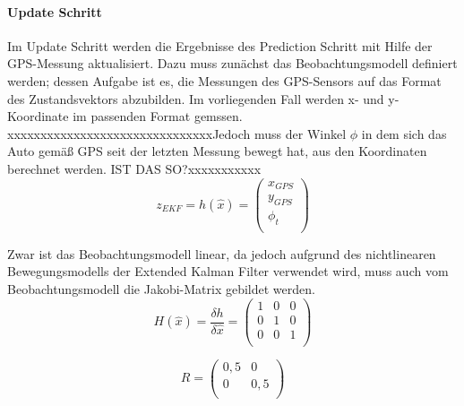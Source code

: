 \documentclass[11pt]{article}
\begin{document}
\paragraph{Update Schritt}
Im Update Schritt werden die Ergebnisse des Prediction Schritt mit Hilfe der GPS-Messung aktualisiert. Dazu muss zunächst das Beobachtungsmodell definiert werden; dessen Aufgabe ist es, die Messungen des GPS-Sensors auf das Format des Zustandsvektors abzubilden. Im vorliegenden Fall werden x- und y-Koordinate im passenden Format gemssen. xxxxxxxxxxxxxxxxxxxxxxxxxxxxxxxJedoch muss der Winkel $\phi$ in dem sich das Auto gemäß GPS seit der letzten Messung bewegt hat, aus den Koordinaten berechnet werden. IST DAS SO?xxxxxxxxxxx
\begin{equation}\label{EKF-Observation-Model}
	z_{EKF} = h(\hat{x}) = \begin{pmatrix}
		x_{GPS} \\
		y_{GPS} \\
		\phi_t \\
	\end{pmatrix}
\end{equation}

Zwar ist das Beobachtungsmodell linear, da jedoch aufgrund des nichtlinearen Bewegungsmodells der Extended Kalman Filter verwendet wird, muss auch vom Beobachtungsmodell die Jakobi-Matrix gebildet werden. 
\begin{equation}\label{EKF-Observation-Model-Jakobi-Matrix}
	H(\hat{x})= \frac{\delta h}{\delta \hat{x}} = \begin{pmatrix}
		1 & 0 & 0 \\
		0 & 1 & 0 \\
		0 & 0 & 1 \\
	\end{pmatrix}
\end{equation}

\begin{equation}\label{GPS-Messungenauigkeits-Matrix}
	R = \begin{pmatrix}
		0,5 & 0 \\
		0 & 0,5 \\
	\end{pmatrix}
\end{equation}
\end{document}
